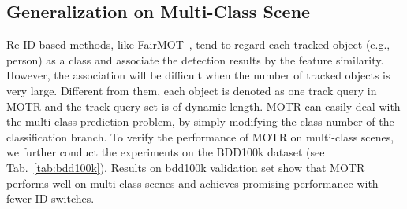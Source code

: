 \documentclass[runningheads]{llncs}
\begin{document}
\begin{table}[t]
  \centering
  \caption{Performance comparison between MOTR and existing methods on the DanceTrack\cite{peize2021dance} dataset. Results for existing methods are from DanceTrack \cite{peize2021dance}.}
  \label{tab_compare_dancetrack}
\end{table}

\subsection{Generalization on Multi-Class Scene}
Re-ID based methods, like FairMOT~\cite{zhang2020fairmot}, tend to regard each tracked object (e.g., person) as a class and associate the detection results by the feature similarity. However, the association will be difficult when the number of tracked objects is very large. Different from them, each object is denoted as one track query in MOTR and the track query set is of dynamic length. MOTR can easily deal with the multi-class prediction problem, by simply modifying the class number of the classification branch. To verify the performance of MOTR on multi-class scenes, we further conduct the experiments on the BDD100k dataset (see Tab.~\ref{tab:bdd100k}). Results on bdd100k validation set show that MOTR performs well on multi-class scenes and achieves promising performance with fewer ID switches.
\end{document}

